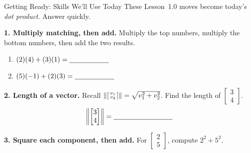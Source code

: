 \documentclass[10pt]{article}
\begin{document}

\vspace{0.12in}

\begin{notesbox}{Getting Ready: Skills We'll Use Today}
\small These Lesson~1.0 moves become today's \emph{dot product}. Answer quickly.

\vspace{4pt}
\textbf{1. Multiply matching, then add.} Multiply the top numbers, multiply the bottom numbers,
then add the two results.
\begin{enumerate}[label=(\alph*), leftmargin=2.0em, itemsep=8pt]
  \item $(2)(4) + (3)(1) = \blank{2.0cm}$
  \item $(5)(-1) + (2)(3) = \blank{2.0cm}$
\end{enumerate}

\vspace{8pt}
\textbf{2. Length of a vector.} Recall $\left\|\begin{bsmallmatrix} v_1 \\ v_2 \end{bsmallmatrix}\right\|
= \sqrt{v_1^2 + v_2^2}$. Find the length of $\begin{bmatrix} 3 \\ 4 \end{bmatrix}$.
\[
  \left\|\begin{bmatrix} 3 \\ 4 \end{bmatrix}\right\| = \blank{3.0cm}
\]

\vspace{6pt}
\textbf{3. Square each component, then add.} For $\begin{bmatrix} 2 \\ 5 \end{bmatrix}$, compute
$2^2 + 5^2$. \writeline
\end{notesbox}
\end{document}
